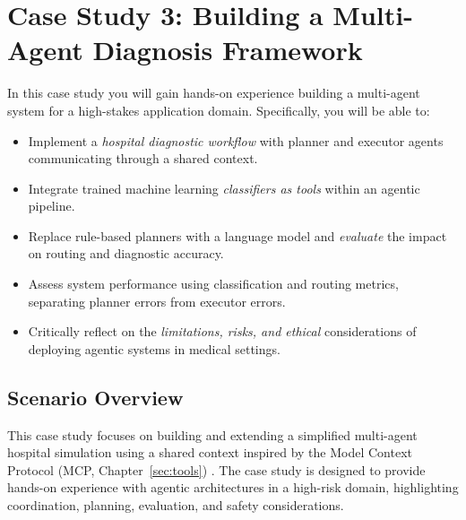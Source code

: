 
\chapter[Case Study 3: Multi-Agent Diagnosis]{Case Study 3: Building a Multi-Agent Diagnosis Framework}

\begin{learningbox}
In this case study you will gain hands-on experience building a multi-agent system for a high-stakes application domain.
Specifically, you will be able to:
\begin{itemize}[leftmargin=*, nosep]
    \item Implement a {\em hospital diagnostic workflow} with planner and executor agents communicating through a shared context.
    \item Integrate trained machine learning {\em classifiers as tools} within an agentic pipeline.
    \item Replace rule-based planners with a language model and {\em evaluate} the impact on routing and diagnostic accuracy.
    \item Assess system performance using classification and routing metrics, separating planner errors from executor errors.
    \item Critically reflect on the {\em limitations, risks, and ethical} considerations of deploying agentic systems in medical settings.
\end{itemize}
\end{learningbox}


\section{Scenario Overview}

This case study focuses on building and extending a simplified multi-agent hospital simulation using a shared context inspired by the Model Context Protocol (MCP, Chapter~\ref{sec:tools}) \citep{xinyi2026mcp}. The case study is designed to provide hands-on experience with agentic architectures in a high-risk domain, highlighting coordination, planning, evaluation, and safety considerations.

